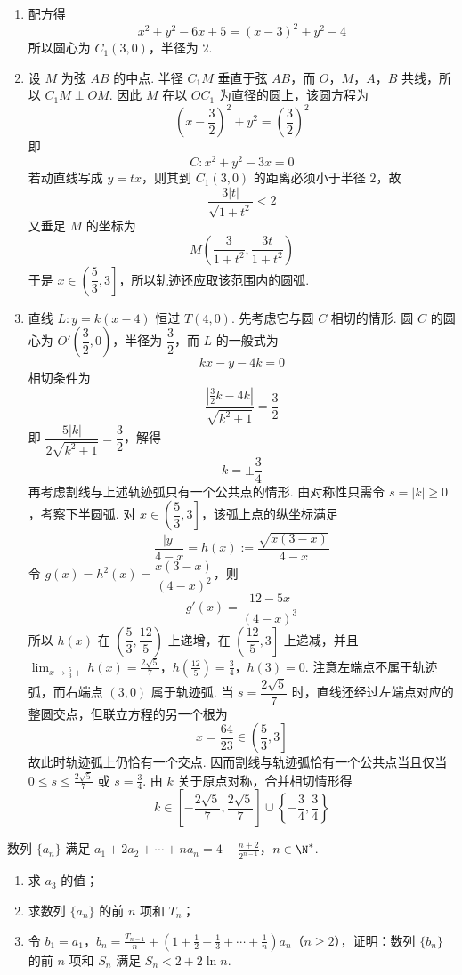 \begin{solution}
\begin{enumerate}
\item 配方得
\[
x^2+y^2-6x+5=(x-3)^2+y^2-4
\]
所以圆心为 \(C_1(3,0)\)，半径为 \(2\).
\item 设 \(M\) 为弦 \(AB\) 的中点. 半径 \(C_1M\) 垂直于弦 \(AB\)，而 \(O\)，\(M\)，\(A\)，\(B\) 共线，所以 \(C_1M\perp OM\). 因此 \(M\) 在以 \(OC_1\) 为直径的圆上，该圆方程为
\[
\left(x-\frac32\right)^2+y^2=\left(\frac32\right)^2
\]
即
\[
C:x^2+y^2-3x=0
\]
若动直线写成 \(y=tx\)，则其到 \(C_1(3,0)\) 的距离必须小于半径 \(2\)，故
\[
\frac{3|t|}{\sqrt{1+t^2}}<2
\]
又垂足 \(M\) 的坐标为
\[
M\left(\frac{3}{1+t^2},\frac{3t}{1+t^2}\right)
\]
于是 \(x\in\left(\dfrac53,3\right]\)，所以轨迹还应取该范围内的圆弧.
\item 直线 \(L:y=k(x-4)\) 恒过 \(T(4,0)\). 先考虑它与圆 \(C\) 相切的情形. 圆 \(C\) 的圆心为 \(O'\left(\dfrac32,0\right)\)，半径为 \(\dfrac32\)，而 \(L\) 的一般式为
\[
kx-y-4k=0
\]
相切条件为
\[
\frac{\left|\frac32k-4k\right|}{\sqrt{k^2+1}}=\frac32
\]
即 \(\dfrac{5|k|}{2\sqrt{k^2+1}}=\dfrac32\)，解得
\[
k=\pm\frac34
\]
再考虑割线与上述轨迹弧只有一个公共点的情形. 由对称性只需令 \(s=|k|\geqslant0\)，考察下半圆弧. 对 \(x\in\left(\dfrac53,3\right]\)，该弧上点的纵坐标满足
\[
\frac{|y|}{4-x}=h(x):=\frac{\sqrt{x(3-x)}}{4-x}
\]
令 \(g(x)=h^2(x)=\dfrac{x(3-x)}{(4-x)^2}\)，则
\[
g'(x)=\frac{12-5x}{(4-x)^3}
\]
所以 \(h(x)\) 在 \(\left(\dfrac53,\dfrac{12}{5}\right)\) 上递增，在 \(\left(\dfrac{12}{5},3\right]\) 上递减，并且
\(\lim_{x\to\frac53+}h(x)=\frac{2\sqrt5}{7}\)，\(h\left(\frac{12}{5}\right)=\frac34\)，\(h(3)=0\).
注意左端点不属于轨迹弧，而右端点 \((3,0)\) 属于轨迹弧. 当 \(s=\dfrac{2\sqrt5}{7}\) 时，直线还经过左端点对应的整圆交点，但联立方程的另一个根为
\[
x=\frac{64}{23}\in\left(\frac53,3\right]
\]
故此时轨迹弧上仍恰有一个交点. 因而割线与轨迹弧恰有一个公共点当且仅当
\(0\leqslant s\leqslant\frac{2\sqrt5}{7}\) 或 \(s=\frac34\).
由 \(k\) 关于原点对称，合并相切情形得
\[
k\in\left[-\frac{2\sqrt5}{7},\frac{2\sqrt5}{7}\right]
\cup\left\{-\frac34,\frac34\right\}
\]
\end{enumerate}
\end{solution}

\begin{problem}
数列 \(\{a_n\}\) 满足 \(a_1 + 2a_2 + \cdots + na_n = 4 - \frac{n + 2}{2^{n - 1}}\)，\(n \in \N^*\).

\begin{enumerate}
\item 求 \(a_3\) 的值；
\item 求数列 \(\{a_n\}\) 的前 \(n\) 项和 \(T_n\)；
\item 令 \(b_1 = a_1\)，\(b_n = \frac{T_{n - 1}}{n} + \left(1 + \frac{1}{2} + \frac{1}{3} + \cdots + \frac{1}{n}\right) a_n\)（\(n \geqslant 2\)），证明：数列 \(\{b_n\}\) 的前 \(n\) 项和 \(S_n\) 满足 \(S_n < 2 + 2 \ln n\).
\end{enumerate}
\end{problem}

